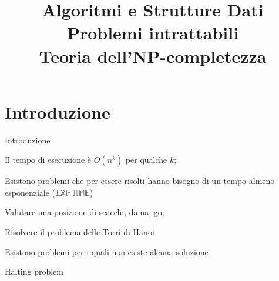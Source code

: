 
\title[ASD - Problemi \NP-completi]{\textbf{Algoritmi e Strutture Dati}\\[12pt]Problemi intrattabili\\Teoria dell'NP-completezza}


\usepackage{xcolor}
\usepackage{colortbl}

\newcommand{\PTIME}{\mbox{\sc $\mathbb{P}$}}
\renewcommand{\NP}{\mbox{$\mathbb{NP}$}}
\newcommand{\TIME}{\mbox{$\mathbb{TIME}$}}
\newcommand{\EXPTIME}{\mbox{$\mathbb{EXPTIME}$}}
\newcommand{\SPACE}{\mbox{$\mathbb{SPACE}$}}
\newcommand{\PSPACE}{\mbox{$\mathbb{PSPACE}$}}

\newcommand{\R}[1]{\textcolor{red}{#1}}
\newcommand{\B}[1]{\textcolor{blue}{#1}}

\renewcommand{\arraystretch}{1.4}
\graphicspath{{figs/18/}}




\FrameTitle{}

\FrameContent



\section{Introduzione}

\begin{frame}{Introduzione}

\BIL
\item  Il tempo di esecuzione è $O(n^k)$ per qualche $k$; 
\EIL

\bigskip
{}
\BIL
\item Esistono problemi che per essere risolti hanno
  bisogno di un tempo almeno esponenziale (\EXPTIME)
    \BI
    \item Valutare una posizione di scacchi, dama, go; 
    \item Risolvere il problema delle Torri di Hanoi
    \EI
\item Esistono problemi per i quali non esiste alcuna soluzione
  \BI
  \item Halting problem
  \EI
\EIL

\end{frame}

